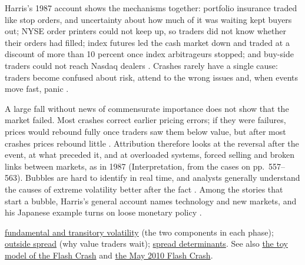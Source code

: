 \begin{qfmechanism}
 Harris's 1987 account shows the mechanisms together: portfolio insurance traded like stop orders, and uncertainty about how much of it was waiting kept buyers out; NYSE order printers could not keep up, so traders did not know whether their orders had filled; index futures led the cash market down and traded at a discount of more than 10 percent once index arbitrageurs stopped; and buy-side traders could not reach Nasdaq dealers \citep[same chap., sec.~28.2.2, pp.~559--563]{alpha-harris}. Crashes rarely have a single cause: traders become confused about risk, attend to the wrong issues and, when events move fast, panic \citep[same chap., sec.~28.2.8, p.~571]{alpha-harris}.

 A large fall without news of commensurate importance does not show that the market failed. Most crashes correct earlier pricing errors; if they were failures, prices would rebound fully once traders saw them below value, but after most crashes prices rebound little \citep[same chap., box, p.~559]{alpha-harris}. Attribution therefore looks at the reversal after the event, at what preceded it, and at overloaded systems, forced selling and broken links between markets, as in 1987 (Interpretation, from the cases on pp.~557--563). Bubbles are hard to identify in real time, and analysts generally understand the causes of extreme volatility better after the fact \citep[same chap., p.~555]{alpha-harris}. Among the stories that start a bubble, Harris's general account names technology and new markets, and his Japanese example turns on loose monetary policy \citep[same chap., sec.~28.2.7, pp.~570--571]{alpha-harris}.

 \hyperref[def:volatility-components]{fundamental and transitory volatility} (the two components in each phase); \hyperref[def:outside-spread]{outside spread} (why value traders wait); \hyperref[res:spread-determinants]{spread determinants}. See also \hyperref[mod:depth-overflow-flash-crash]{the toy model of the Flash Crash} and \hyperref[ev:may-2010-flash-crash]{the May 2010 Flash Crash}.


\end{qfmechanism}
